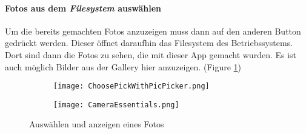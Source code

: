 \paragraph{Fotos aus dem \textit{Filesystem} auswählen}
 Um die bereits gemachten Fotos anzuzeigen muss dann auf den anderen Button gedrückt werden.
 Dieser öffnet daraufhin das Filesystem des Betriebssystems. Dort sind dann die Fotos zu sehen, die mit dieser App gemacht wurden.
 Es ist auch möglich Bilder aus der Gallery hier anzuzeigen. (Figure \ref{fig:TakePicFromPicker})

 \begin{figure}[hbt!]
    \centering
    \begin{subfigure}[b]{0.4\linewidth}
        \texttt{[image: ChoosePickWithPicPicker.png]}
      \end{subfigure}
      \begin{subfigure}[b]{0.4\linewidth}
        \texttt{[image: CameraEssentials.png]}
      \end{subfigure}
    \caption{Auswählen und anzeigen eines Fotos}
    \label{fig:TakePicFromPicker}
\end{figure}



